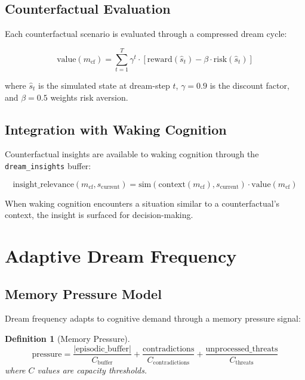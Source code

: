 \documentclass[11pt,a4paper]{article}
\newtheorem{definition}{Definition}
\begin{document}
\subsection{Counterfactual Evaluation}

Each counterfactual scenario is evaluated through a compressed dream cycle:

\begin{equation}
\text{value}(m_{\text{cf}}) = \sum_{t=1}^{T} \gamma^t \cdot \left[\text{reward}(\hat{s}_t) - \beta \cdot \text{risk}(\hat{s}_t)\right]
\end{equation}

where $\hat{s}_t$ is the simulated state at dream-step $t$, $\gamma = 0.9$ is the discount factor, and $\beta = 0.5$ weights risk aversion.

\subsection{Integration with Waking Cognition}

Counterfactual insights are available to waking cognition through the \texttt{dream\_insights} buffer:

\begin{equation}
\text{insight\_relevance}(m_{\text{cf}}, s_{\text{current}}) = \text{sim}(\text{context}(m_{\text{cf}}), s_{\text{current}}) \cdot \text{value}(m_{\text{cf}})
\end{equation}

When waking cognition encounters a situation similar to a counterfactual's context, the insight is surfaced for decision-making.

\section{Adaptive Dream Frequency}

\subsection{Memory Pressure Model}

Dream frequency adapts to cognitive demand through a memory pressure signal:

\begin{definition}[Memory Pressure]
\begin{equation}
\text{pressure} = \frac{|\text{episodic\_buffer}|}{C_{\text{buffer}}} + \frac{\text{contradictions}}{C_{\text{contradictions}}} + \frac{\text{unprocessed\_threats}}{C_{\text{threats}}}
\end{equation}
where $C$ values are capacity thresholds.
\end{definition}
\end{document}
